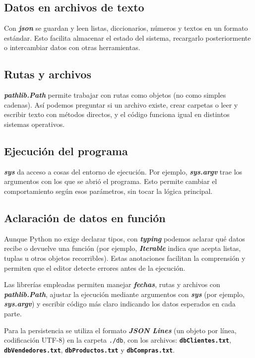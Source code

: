 \documentclass[11pt]{article}
\begin{document}
\subsection{Datos en archivos de texto}
Con \textbf{\textit{json}} se guardan y leen listas, diccionarios, números y textos en un formato estándar. Esto facilita almacenar el estado del sistema, recargarlo posteriormente o intercambiar datos con otras herramientas.

\subsection{Rutas y archivos}
\textbf{\textit{pathlib.Path}} permite trabajar con rutas como objetos (no como simples cadenas). Así podemos preguntar si un archivo existe, crear carpetas o leer y escribir texto con métodos directos, y el código funciona igual en distintos sistemas operativos.

\subsection{Ejecución del programa}
\textbf{\textit{sys}} da acceso a cosas del entorno de ejecución. Por ejemplo, \textbf{\textit{sys.argv}} trae los argumentos con los que se abrió el programa. Esto permite cambiar el comportamiento según esos parámetros, sin tocar la lógica principal.

\subsection{Aclaración de datos en función}
Aunque Python no exige declarar tipos, con \textbf{\textit{typing}} podemos aclarar qué datos recibe o devuelve una función (por ejemplo, \textbf{\textit{Iterable}} indica que acepta listas, tuplas u otros objetos recorribles). Estas anotaciones facilitan la comprensión y permiten que el editor detecte errores antes de la ejecución.

Las librerías empleadas permiten manejar \textbf{\textit{fechas}}, rutas y archivos con \textbf{\textit{pathlib.Path}}, ajustar la ejecución mediante argumentos con \textbf{\textit{sys}} (por ejemplo, \textbf{\textit{sys.argv}}) y escribir código más claro indicando los datos esperados en cada parte.

Para la persistencia se utiliza el formato \textbf{\textit{JSON Lines}} (un objeto por línea, codificación UTF-8) en la carpeta \texttt{./db}, con los archivos: \textbf{\texttt{dbClientes.txt}}, \textbf{\texttt{dbVendedores.txt}}, \textbf{\texttt{dbProductos.txt}} y \textbf{\texttt{dbCompras.txt}}.
\end{document}
